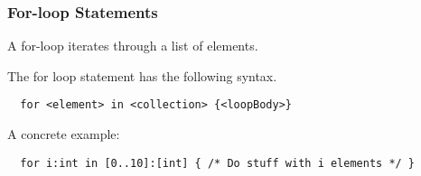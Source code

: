 \subsubsection{For-loop Statements}
\label{subsec:forLoopStatements}

A for-loop iterates through a list of elements.

The for loop statement has the following syntax.

\begin{verbatim}
  for <element> in <collection> {<loopBody>}
\end{verbatim}

A concrete example:

\begin{verbatim}
  for i:int in [0..10]:[int] { /* Do stuff with i elements */ }
\end{verbatim}